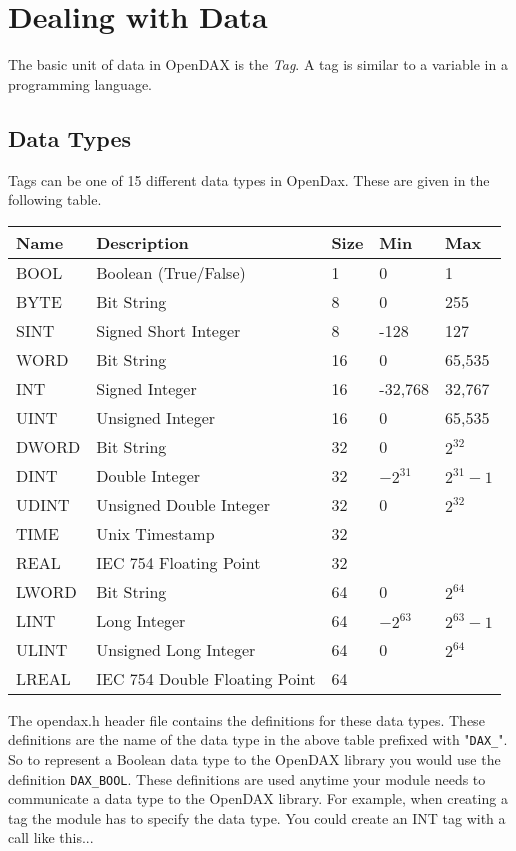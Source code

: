 \chapter{Dealing with Data}
The basic unit of data in OpenDAX is the \textit{Tag}.  A tag is similar to a variable in a programming language.
\section{Data Types}
Tags can be one of 15 different data types in OpenDax.  These are given in the following table.

\begin{tabular}{|l|l|l|l|l|}
\hline \textbf{Name} & \textbf{Description} & \textbf{Size} & \textbf{Min} & \textbf{Max} \\
\hline BOOL & Boolean (True/False) & 1 & 0 & 1 \\
\hline BYTE & Bit String & 8 & 0 & 255 \\
\hline SINT & Signed Short Integer & 8 & -128 & 127 \\
\hline WORD & Bit String & 16 & 0 & 65,535 \\
\hline INT & Signed Integer & 16 & -32,768 & 32,767 \\
\hline UINT & Unsigned Integer & 16 & 0 & 65,535 \\
\hline DWORD & Bit String & 32 & 0 & $2^{32}$ \\
\hline DINT & Double Integer & 32 & $-2^{31}$ & $2^{31}-1$ \\
\hline UDINT & Unsigned Double Integer & 32 & 0 & $2^{32}$ \\
\hline TIME & Unix Timestamp & 32 &  &  \\
\hline REAL & IEC 754 Floating Point & 32 &  &  \\
\hline LWORD & Bit String & 64 & 0 & $2^{64}$ \\
\hline LINT & Long Integer & 64 & $-2^{63}$ & $2^{63}-1$ \\
\hline ULINT & Unsigned Long Integer & 64 & 0 & $2^{64}$ \\
\hline LREAL & IEC 754 Double Floating Point & 64 &  &  \\
\hline 
\end{tabular}
 
The opendax.h header file contains the definitions for these data types.  These definitions are the name of the data type in the above table prefixed with "\texttt{DAX\_}".  So to represent a Boolean data type to the OpenDAX library you would use the definition \texttt{DAX\_BOOL}.  These definitions are used anytime your module needs to communicate a data type to the OpenDAX library.  For example, when creating a tag the module has to specify the data type.  You could create an INT tag with a call like this...

